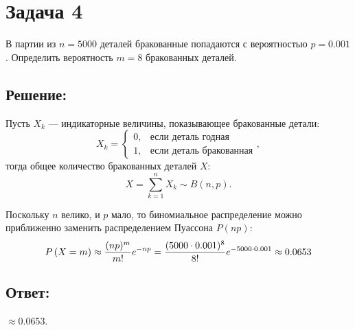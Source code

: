 \section*{Задача 4}

В партии из $n = 5000$ деталей бракованные попадаются с вероятностью $p = 0.001$. Определить вероятность $m=8$ бракованных деталей.

\subsection*{Решение:}

Пусть $X_k$ --- индикаторные величины, показывающее бракованные детали:
\begin{equation}
    X_k
    = \left \{
    \begin{array}{ll}
        0, & \text{если деталь годная}      \\
        1, & \text{если деталь бракованная}
    \end{array}
    \right .
    ,
\end{equation}
тогда общее количество бракованных деталей $X$:
\begin{equation}
    X = \sum_{k=1}^n X_k \sim B \left ( n, p \right ).
\end{equation}

Поскольку $n$ велико, и $p$ мало, то биномиальное распределение можно приближенно заменить распределением Пуассона $P(np)$:
\begin{equation}
    P \left ( X = m \right )
    \approx \frac{(np)^m}{m!} e^{-np}
    = \frac{(5000 \cdot 0.001)^8}{8!} e^{-5000 \cdot 0.001}
    \approx 0.0653
\end{equation}

\subsection*{Ответ:}
$\approx 0.0653$.

